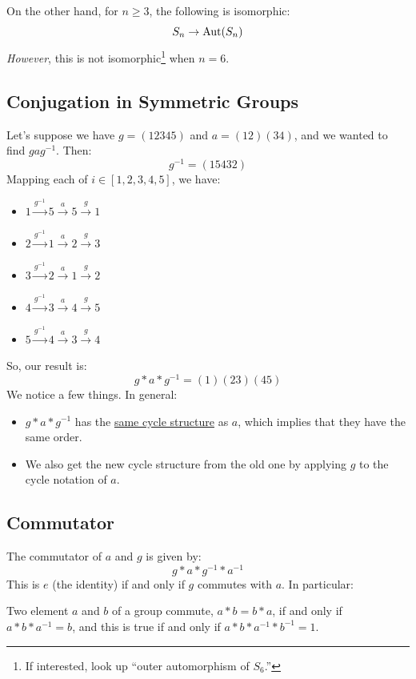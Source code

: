 \documentclass[letterpaper]{article}
\begin{document}
\bigskip 

On the other hand, for $n \geq 3$, the following is isomorphic:  
\[S_n \to \operatorname{Aut}(S_n)\]
\emph{However}, this is not isomorphic\footnote{If interested, look up ``outer automorphism of $S_6$.''} when $n = 6$. 

\subsection{Conjugation in Symmetric Groups}
Let's suppose we have $g = (12345)$ and $a = (12)(34)$, and we wanted to find $gag^{-1}$. Then: 
\[g^{-1} = (15432)\]
Mapping each of $i \in [1, 2, 3, 4, 5]$, we have: 
\begin{itemize}
    \item $1 \xrightarrow{g^{-1}} 5 \xrightarrow{a} 5 \xrightarrow{g} 1$
    \item $2 \xrightarrow{g^{-1}} 1 \xrightarrow{a} 2 \xrightarrow{g} 3$
    \item $3 \xrightarrow{g^{-1}} 2 \xrightarrow{a} 1 \xrightarrow{g} 2$
    \item $4 \xrightarrow{g^{-1}} 3 \xrightarrow{a} 4 \xrightarrow{g} 5$
    \item $5 \xrightarrow{g^{-1}} 4 \xrightarrow{a} 3 \xrightarrow{g} 4$
\end{itemize}
So, our result is: 
\[g * a * g^{-1} = (1)(23)(45)\]
We notice a few things. In general:  
\begin{itemize}
    \item $g * a * g^{-1}$ has the \underline{same cycle structure} as $a$, which implies that they have the same order. 
    \item We also get the new cycle structure from the old one by applying $g$ to the cycle notation of $a$. 
\end{itemize}

\subsection{Commutator}
The commutator of $a$ and $g$ is given by: 
\[g * a * g^{-1} * a^{-1}\]
This is $e$ (the identity) if and only if $g$ commutes with $a$. In particular: 
\begin{lemma}{}{}
    Two element $a$ and $b$ of a group commute, $a * b = b * a$, if and only if $a * b * a^{-1} = b$, and this is true if and only if $a * b * a^{-1} * b^{-1} = 1$. 
\end{lemma}
\end{document}
